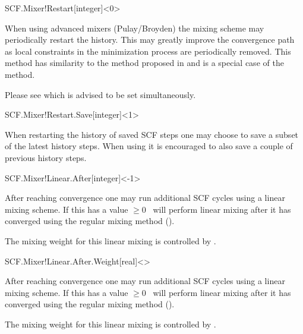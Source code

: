 \begin{fdfentry}{SCF.Mixer!Restart}[integer]<0>

  When using advanced mixers (Pulay/Broyden) the mixing scheme may
  periodically restart the history. This may greatly improve the
  convergence path as local constraints in the minimization process
  are periodically removed. This method has similarity to the method
  proposed in \citet{Banerjee2016} and is a special case of the
   method.

  Please see  which is advised to be set
  simultaneously. 
  
\end{fdfentry}

\begin{fdfentry}{SCF.Mixer!Restart.Save}[integer]<1>

  When restarting the history of saved SCF steps one may choose to
  save a subset of the latest history steps.
  When using  it is encouraged to also save a
  couple of previous history steps.
  
\end{fdfentry}


\begin{fdfentry}{SCF.Mixer!Linear.After}[integer]<-1>

  After reaching convergence one may run additional SCF cycles using a
  linear mixing scheme. If this has a value $\ge 0$ \siesta\ will
  perform linear mixing after it has converged using the regular
  mixing method ().

  The mixing weight for this linear mixing is controlled by .

\end{fdfentry}



\begin{fdfentry}{SCF.Mixer!Linear.After.Weight}[real]<>

  After reaching convergence one may run additional SCF cycles using a
  linear mixing scheme. If this has a value $\ge 0$ \siesta\ will
  perform linear mixing after it has converged using the regular
  mixing method ().

  The mixing weight for this linear mixing is controlled by .

\end{fdfentry}


